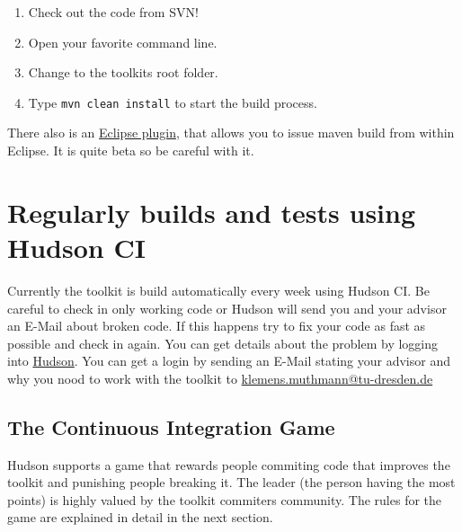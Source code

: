 \documentclass[a4paper,twoside]{book}      %
\begin{document}
\begin{enumerate}
\item Check out the code from SVN!
\item Open your favorite command line.
\item Change to the toolkits root folder.
\item Type \texttt{mvn clean install} to start the build process.
\end{enumerate}
There also is an \href{http://m2eclipse.sonatype.org/}{Eclipse plugin}, that allows you to issue maven build from within Eclipse. It is quite beta so be careful with it.
\section{Regularly builds and tests using Hudson CI}
Currently the toolkit is build automatically every week using Hudson CI. Be careful to check in only working code or Hudson will send you and your advisor an E-Mail about broken code. If this happens try to fix your code as fast as possible and check in again. You can get details about the problem by logging into \href{http://www.effingo.de/hudson}{Hudson}. You can get a login by sending an E-Mail stating your advisor and why you nood to work with the toolkit to \href{mailto:klemens.muthmann@tu-dresden.de}{klemens.muthmann@tu-dresden.de}
\subsection{The Continuous Integration Game}
\label{sec:cigame}
Hudson supports a game that rewards people commiting code that improves the toolkit and punishing people breaking it. The leader (the person having the most points) is highly valued by the toolkit commiters community. The rules for the game are explained in detail in the next section.
\end{document}
